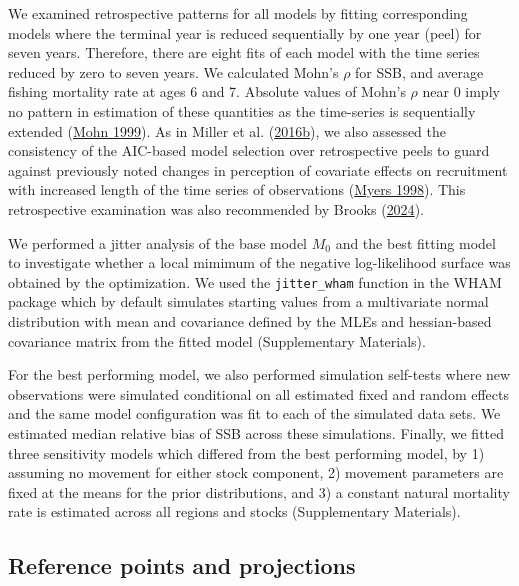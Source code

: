 \documentclass[
]{article}
\begin{document}
We examined retrospective patterns for all models by fitting corresponding models where the terminal year is reduced sequentially by one year (peel) for seven years. Therefore, there are eight fits of each model with the time series reduced by zero to seven years. We calculated Mohn's \(\rho\) for SSB, and average fishing mortality rate at ages 6 and 7. Absolute values of Mohn's \(\rho\) near 0 imply no pattern in estimation of these quantities as the time-series is sequentially extended (\protect\hyperlink{ref-mohn99}{Mohn 1999}). As in Miller et al. (\protect\hyperlink{ref-milleretal16}{2016b}), we also assessed the consistency of the AIC-based model selection over retrospective peels to guard against previously noted changes in perception of covariate effects on recruitment with increased length of the time series of observations (\protect\hyperlink{ref-myers98}{Myers 1998}). This retrospective examination was also recommended by Brooks (\protect\hyperlink{ref-brooks24}{2024}).

We performed a jitter analysis of the base model \(M_0\) and the best fitting model to investigate whether a local mimimum of the negative log-likelihood surface was obtained by the optimization. We used the \verb|jitter_wham| function in the WHAM package which by default simulates starting values from a multivariate normal distribution with mean and covariance defined by the MLEs and hessian-based covariance matrix from the fitted model (Supplementary Materials).

For the best performing model, we also performed simulation self-tests where new observations were simulated conditional on all estimated fixed and random effects and the same model configuration was fit to each of the simulated data sets. We estimated median relative bias of SSB across these simulations. Finally, we fitted three sensitivity models which differed from the best performing model, by 1) assuming no movement for either stock component, 2) movement parameters are fixed at the means for the prior distributions, and 3) a constant natural mortality rate is estimated across all regions and stocks (Supplementary Materials).

\hypertarget{reference-points-and-projections}{%
\subsection*{Reference points and projections}\label{reference-points-and-projections}}
\end{document}
